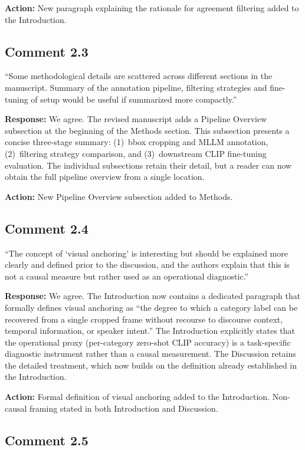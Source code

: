 \documentclass[11pt]{article}
\begin{document}
\textbf{Action:} New paragraph explaining the rationale for agreement filtering added to the Introduction.

\subsection*{Comment 2.3}

``Some methodological details are scattered across different sections in the manuscript. Summary of the annotation pipeline, filtering strategies and fine-tuning of setup would be useful if summarized more compactly.''

\textbf{Response:} We agree. The revised manuscript adds a Pipeline Overview subsection at the beginning of the Methods section. This subsection presents a concise three-stage summary: (1)~bbox cropping and MLLM annotation, (2)~filtering strategy comparison, and (3)~downstream CLIP fine-tuning evaluation. The individual subsections retain their detail, but a reader can now obtain the full pipeline overview from a single location.

\textbf{Action:} New Pipeline Overview subsection added to Methods.

\subsection*{Comment 2.4}

``The concept of `visual anchoring' is interesting but should be explained more clearly and defined prior to the discussion, and the authors explain that this is not a causal measure but rather used as an operational diagnostic.''

\textbf{Response:} We agree. The Introduction now contains a dedicated paragraph that formally defines visual anchoring as ``the degree to which a category label can be recovered from a single cropped frame without recourse to discourse context, temporal information, or speaker intent.'' The Introduction explicitly states that the operational proxy (per-category zero-shot CLIP accuracy) is a task-specific diagnostic instrument rather than a causal measurement. The Discussion retains the detailed treatment, which now builds on the definition already established in the Introduction.

\textbf{Action:} Formal definition of visual anchoring added to the Introduction. Non-causal framing stated in both Introduction and Discussion.

\subsection*{Comment 2.5}
\end{document}
